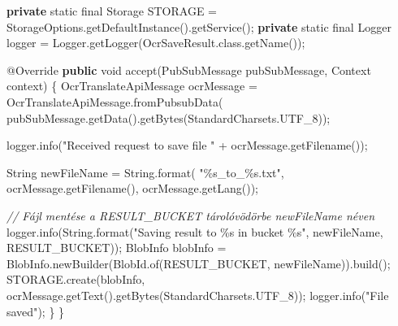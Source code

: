 \documentclass[
]{article}
\newenvironment{Shaded}{}{}
\newcommand{\AttributeTok}[1]{\textcolor[rgb]{0.49,0.56,0.16}{#1}}
\newcommand{\BuiltInTok}[1]{\textcolor[rgb]{0.00,0.50,0.00}{#1}}
\newcommand{\CommentTok}[1]{\textcolor[rgb]{0.38,0.63,0.69}{\textit{#1}}}
\newcommand{\DataTypeTok}[1]{\textcolor[rgb]{0.56,0.13,0.00}{#1}}
\newcommand{\FunctionTok}[1]{\textcolor[rgb]{0.02,0.16,0.49}{#1}}
\newcommand{\KeywordTok}[1]{\textcolor[rgb]{0.00,0.44,0.13}{\textbf{#1}}}
\newcommand{\NormalTok}[1]{#1}
\newcommand{\OperatorTok}[1]{\textcolor[rgb]{0.40,0.40,0.40}{#1}}
\newcommand{\SpecialCharTok}[1]{\textcolor[rgb]{0.25,0.44,0.63}{#1}}
\newcommand{\StringTok}[1]{\textcolor[rgb]{0.25,0.44,0.63}{#1}}
\begin{document}
\begin{Shaded}
\begin{Highlighting}[]
  \KeywordTok{private} \DataTypeTok{static} \DataTypeTok{final}\NormalTok{ Storage STORAGE }\OperatorTok{=}\NormalTok{ StorageOptions}\OperatorTok{.}\FunctionTok{getDefaultInstance}\OperatorTok{().}\FunctionTok{getService}\OperatorTok{();}
  \KeywordTok{private} \DataTypeTok{static} \DataTypeTok{final} \BuiltInTok{Logger}\NormalTok{ logger }\OperatorTok{=} \BuiltInTok{Logger}\OperatorTok{.}\FunctionTok{getLogger}\OperatorTok{(}\NormalTok{OcrSaveResult}\OperatorTok{.}\FunctionTok{class}\OperatorTok{.}\FunctionTok{getName}\OperatorTok{());}

  \AttributeTok{@Override}
  \KeywordTok{public} \DataTypeTok{void} \FunctionTok{accept}\OperatorTok{(}\NormalTok{PubSubMessage pubSubMessage}\OperatorTok{,} \BuiltInTok{Context}\NormalTok{ context}\OperatorTok{)} \OperatorTok{\{}
\NormalTok{    OcrTranslateApiMessage ocrMessage }\OperatorTok{=}\NormalTok{ OcrTranslateApiMessage}\OperatorTok{.}\FunctionTok{fromPubsubData}\OperatorTok{(}
\NormalTok{        pubSubMessage}\OperatorTok{.}\FunctionTok{getData}\OperatorTok{().}\FunctionTok{getBytes}\OperatorTok{(}\NormalTok{StandardCharsets}\OperatorTok{.}\FunctionTok{UTF\_8}\OperatorTok{));}

\NormalTok{    logger}\OperatorTok{.}\FunctionTok{info}\OperatorTok{(}\StringTok{"Received request to save file "} \OperatorTok{+}\NormalTok{ ocrMessage}\OperatorTok{.}\FunctionTok{getFilename}\OperatorTok{());}

    \BuiltInTok{String}\NormalTok{ newFileName }\OperatorTok{=} \BuiltInTok{String}\OperatorTok{.}\FunctionTok{format}\OperatorTok{(}
        \StringTok{"}\SpecialCharTok{\%s}\StringTok{\_to\_}\SpecialCharTok{\%s}\StringTok{.txt"}\OperatorTok{,}\NormalTok{ ocrMessage}\OperatorTok{.}\FunctionTok{getFilename}\OperatorTok{(),}\NormalTok{ ocrMessage}\OperatorTok{.}\FunctionTok{getLang}\OperatorTok{());}

    \CommentTok{// Fájl mentése a RESULT\_BUCKET tárolóvödörbe newFileName néven}
\NormalTok{    logger}\OperatorTok{.}\FunctionTok{info}\OperatorTok{(}\BuiltInTok{String}\OperatorTok{.}\FunctionTok{format}\OperatorTok{(}\StringTok{"Saving result to }\SpecialCharTok{\%s}\StringTok{ in bucket }\SpecialCharTok{\%s}\StringTok{"}\OperatorTok{,}\NormalTok{ newFileName}\OperatorTok{,}\NormalTok{ RESULT\_BUCKET}\OperatorTok{));}
\NormalTok{    BlobInfo blobInfo }\OperatorTok{=}\NormalTok{ BlobInfo}\OperatorTok{.}\FunctionTok{newBuilder}\OperatorTok{(}\NormalTok{BlobId}\OperatorTok{.}\FunctionTok{of}\OperatorTok{(}\NormalTok{RESULT\_BUCKET}\OperatorTok{,}\NormalTok{ newFileName}\OperatorTok{)).}\FunctionTok{build}\OperatorTok{();}
\NormalTok{    STORAGE}\OperatorTok{.}\FunctionTok{create}\OperatorTok{(}\NormalTok{blobInfo}\OperatorTok{,}\NormalTok{ ocrMessage}\OperatorTok{.}\FunctionTok{getText}\OperatorTok{().}\FunctionTok{getBytes}\OperatorTok{(}\NormalTok{StandardCharsets}\OperatorTok{.}\FunctionTok{UTF\_8}\OperatorTok{));}
\NormalTok{    logger}\OperatorTok{.}\FunctionTok{info}\OperatorTok{(}\StringTok{"File saved"}\OperatorTok{);}
  \OperatorTok{\}}
\OperatorTok{\}}
\end{Highlighting}
\end{Shaded}
\end{document}
